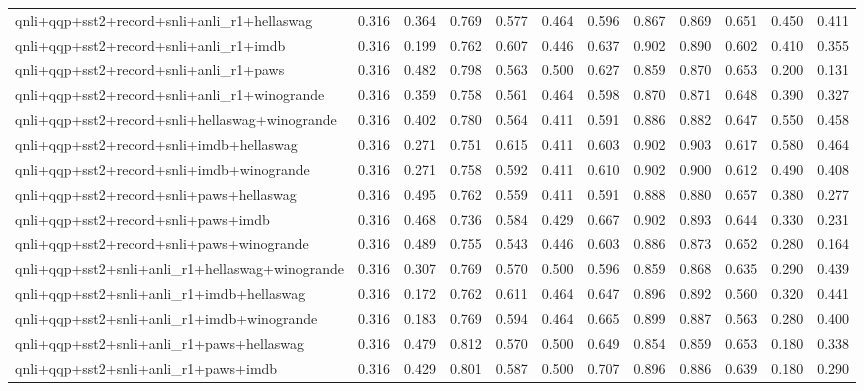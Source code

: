 \begin{table}[t]
\begin{tabular}{lrrrrrrrrrrr}
    qnli+qqp+sst2+record+snli+anli\_r1+hellaswag & 0.316 & 0.364 & 0.769 & 0.577 & 0.464 & 0.596 & 0.867 & 0.869 & 0.651 & 0.450 & 0.411 \\
    qnli+qqp+sst2+record+snli+anli\_r1+imdb & 0.316 & 0.199 & 0.762 & 0.607 & 0.446 & 0.637 & 0.902 & 0.890 & 0.602 & 0.410 & 0.355 \\
    qnli+qqp+sst2+record+snli+anli\_r1+paws & 0.316 & 0.482 & 0.798 & 0.563 & 0.500 & 0.627 & 0.859 & 0.870 & 0.653 & 0.200 & 0.131 \\
    qnli+qqp+sst2+record+snli+anli\_r1+winogrande & 0.316 & 0.359 & 0.758 & 0.561 & 0.464 & 0.598 & 0.870 & 0.871 & 0.648 & 0.390 & 0.327 \\
    qnli+qqp+sst2+record+snli+hellaswag+winogrande & 0.316 & 0.402 & 0.780 & 0.564 & 0.411 & 0.591 & 0.886 & 0.882 & 0.647 & 0.550 & 0.458 \\
    qnli+qqp+sst2+record+snli+imdb+hellaswag & 0.316 & 0.271 & 0.751 & 0.615 & 0.411 & 0.603 & 0.902 & 0.903 & 0.617 & 0.580 & 0.464 \\
    qnli+qqp+sst2+record+snli+imdb+winogrande & 0.316 & 0.271 & 0.758 & 0.592 & 0.411 & 0.610 & 0.902 & 0.900 & 0.612 & 0.490 & 0.408 \\
    qnli+qqp+sst2+record+snli+paws+hellaswag & 0.316 & 0.495 & 0.762 & 0.559 & 0.411 & 0.591 & 0.888 & 0.880 & 0.657 & 0.380 & 0.277 \\
    qnli+qqp+sst2+record+snli+paws+imdb & 0.316 & 0.468 & 0.736 & 0.584 & 0.429 & 0.667 & 0.902 & 0.893 & 0.644 & 0.330 & 0.231 \\
    qnli+qqp+sst2+record+snli+paws+winogrande & 0.316 & 0.489 & 0.755 & 0.543 & 0.446 & 0.603 & 0.886 & 0.873 & 0.652 & 0.280 & 0.164 \\
    qnli+qqp+sst2+snli+anli\_r1+hellaswag+winogrande & 0.316 & 0.307 & 0.769 & 0.570 & 0.500 & 0.596 & 0.859 & 0.868 & 0.635 & 0.290 & 0.439 \\
    qnli+qqp+sst2+snli+anli\_r1+imdb+hellaswag & 0.316 & 0.172 & 0.762 & 0.611 & 0.464 & 0.647 & 0.896 & 0.892 & 0.560 & 0.320 & 0.441 \\
    qnli+qqp+sst2+snli+anli\_r1+imdb+winogrande & 0.316 & 0.183 & 0.769 & 0.594 & 0.464 & 0.665 & 0.899 & 0.887 & 0.563 & 0.280 & 0.400 \\
    qnli+qqp+sst2+snli+anli\_r1+paws+hellaswag & 0.316 & 0.479 & 0.812 & 0.570 & 0.500 & 0.649 & 0.854 & 0.859 & 0.653 & 0.180 & 0.338 \\
    qnli+qqp+sst2+snli+anli\_r1+paws+imdb & 0.316 & 0.429 & 0.801 & 0.587 & 0.500 & 0.707 & 0.896 & 0.886 & 0.639 & 0.180 & 0.290 \\

\end{tabular}
\end{table}
